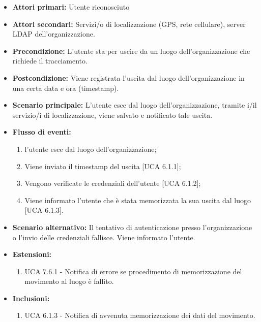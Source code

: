 \begin{itemize}
	\item \textbf{Attori primari:} Utente riconosciuto
	\item \textbf{Attori secondari:} Servizi/o di localizzazione (GPS, rete cellulare), server LDAP dell'organizzazione.
	\item \textbf{Precondizione:} L'utente sta per uscire da un luogo dell'organizzazione che richiede il tracciamento.
	\item \textbf{Postcondizione:} Viene registrata l'uscita dal luogo dell'organizzazione in una certa data e ora (timestamp).
	\item \textbf{Scenario principale:} L'utente esce dal luogo dell'organizzazione, tramite i/il servizio/i di localizzazione, viene salvato e notificato tale uscita. 
		\item \textbf{Flusso di eventi:}
	\begin{enumerate}
		\item l'utente esce dal luogo dell'organizzazione;
		\item Viene inviato il timestamp  del uscita [UCA 6.1.1];
		\item Vengono verificate le credenziali dell'utente [UCA 6.1.2];
		\item Viene informato l'utente che è stata memorizzata la sua uscita dal luogo [UCA 6.1.3].
	\end{enumerate}
	\item \textbf{Scenario alternativo:} Il tentativo di autenticazione presso l'organizzazione o l'invio delle credenziali fallisce. Viene informato l'utente.
	\item \textbf{Estensioni:}
		\begin{enumerate}
		\item UCA 7.6.1 - Notifica di errore se procedimento di memorizzazione del movimento al luogo è fallito.
	\end{enumerate}
	\item \textbf{Inclusioni:}
	\begin{enumerate}
		\item UCA 6.1.3 - Notifica di avvenuta memorizzazione dei dati del movimento.
	\end{enumerate}
\end{itemize}

